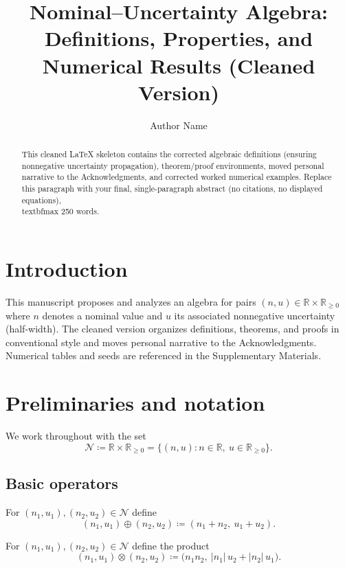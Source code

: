 \documentclass[11pt]{amsart}
\title[Nominal--Uncertainty Algebra (cleaned)]{Nominal--Uncertainty Algebra: Definitions, Properties, and Numerical Results (Cleaned Version)}
\author{Author Name}
\begin{document}
\begin{abstract}
This cleaned LaTeX skeleton contains the corrected algebraic definitions (ensuring nonnegative uncertainty propagation), theorem/proof environments, moved personal narrative to the Acknowledgments, and corrected worked numerical examples. Replace this paragraph with your final, single-paragraph abstract (no citations, no displayed equations), \\textbf{max 250 words}.
\end{abstract}

\maketitle

\section{Introduction}
This manuscript proposes and analyzes an algebra for pairs $(n,u)\in\mathbb{R}\times\mathbb{R}_{\ge 0}$ where $n$ denotes a nominal value and $u$ its associated nonnegative uncertainty (half-width). The cleaned version organizes definitions, theorems, and proofs in conventional style and moves personal narrative to the Acknowledgments. Numerical tables and seeds are referenced in the Supplementary Materials.

\section{Preliminaries and notation}
We work throughout with the set
\begin{equation*}
\mathcal{N} \coloneqq \mathbb{R}\times\mathbb{R}_{\ge 0} = \{(n,u): n\in\mathbb{R},\ u\in\mathbb{R}_{\ge 0}\}.
\end{equation*}

\subsection{Basic operators}
\begin{definition}[Addition]
For $(n_1,u_1),(n_2,u_2)\in\mathcal{N}$ define
\begin{equation*}
(n_1,u_1)\oplus(n_2,u_2)\coloneqq (n_1+n_2,\ u_1+u_2).
\end{equation*}
\end{definition}

\begin{definition}\label{def:multiply}
For $(n_1,u_1),(n_2,u_2)\in\mathcal{N}$ define the product
\begin{equation}\label{eq:multiplication}
(n_1,u_1)\otimes(n_2,u_2)\coloneqq\big(n_1 n_2,\ |n_1|\,u_2 + |n_2|\,u_1\big).
\end{equation}
\end{definition}
\end{document}
